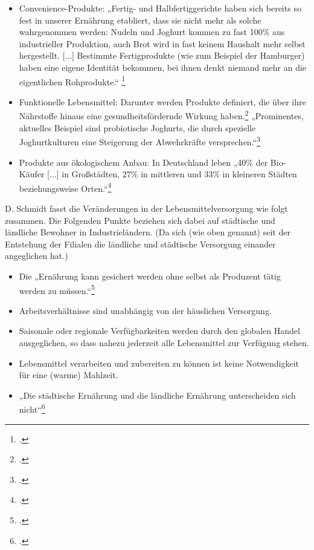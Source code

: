 \documentclass{scrartcl}
\begin{document}
 \begin{itemize}
\item Convenience-Produkte: „Fertig- und Halbfertiggerichte haben sich bereits so fest in unserer Ernährung etabliert, dass sie nicht mehr als solche wahrgenommen werden: Nudeln und Joghurt kommen zu fast 100\% aus industrieller Produktion, auch Brot wird in fast keinem Haushalt mehr selbst hergestellt. [...] Bestimmte Fertigprodukte (wie zum Beispiel der Hamburger)
haben eine eigene Identität bekommen, bei ihnen denkt niemand mehr an die eigentlichen Rohprodukte.“ \footcite{Escher2003EssenKultur}
\item Funktionelle Lebensmittel: Darunter werden Produkte definiert, die über ihre Nährstoffe hinaus eine gesundheitsfördernde Wirkung haben.\footcites[Vgl.][S.5]{Heasman1958-2001TheProfits} „Prominentes, aktuelles Beispiel sind probiotische Joghurts, die durch spezielle Joghurtkulturen eine Steigerung der Abwehrkräfte versprechen.“\footcite[S.14]{Stierand2008StadtLebensmittel}
\item Produkte aus ökologischem Anbau: In Deutschland leben „40\% der Bio-Käufer [...] in Großstädten, 27\% in mittleren und 33\% in kleineren Städten beziehungsweise Orten.“\footcite[S.14]{Stierand2008StadtLebensmittel}
\end{itemize}
D. Schmidt fasst die Veränderungen in der Lebensmittelversorgung wie folgt zusammen. Die Folgenden Punkte beziehen sich dabei auf städtische und ländliche Bewohner in Industrieländern. (Da sich (wie oben genannt) seit der Entstehung der Filialen die ländliche und städtische Versorgung einander angeglichen hat.)

\begin{itemize}
\item Die „Ernährung kann gesichert werden ohne selbst als Produzent tätig werden zu
müssen.“\footcite[S.20]{SchmidtDieVon}
\item Arbeitsverhältnisse sind unabhängig von der häuslichen Versorgung.
\item Saisonale oder regionale Verfügbarkeiten werden durch den globalen Handel
ausgeglichen, so dass nahezu jederzeit alle Lebensmittel zur Verfügung stehen.
\item Lebensmittel verarbeiten und zubereiten zu können ist keine Notwendigkeit für
eine (warme) Mahlzeit.
\item „Die städtische Ernährung und die ländliche Ernährung unterscheiden sich nicht“\footcite[S.20]{SchmidtDieVon}
\end{itemize}
\end{document}
